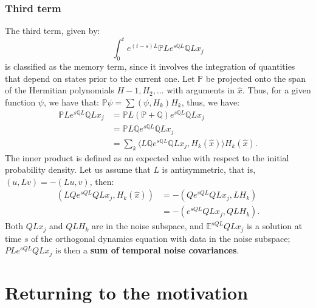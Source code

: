 \documentclass[12pt]{article}
\begin{document}
\subsubsection{Third term}
The third term, given by:
\begin{equation*}
    \int_0^t e^{(t-s)L} \mathbb{P}L e^{s\mathbb{Q}L} \mathbb{Q}L x_j
\end{equation*}
is classified as the memory term, since it involves the integration of quantities that depend on states prior to the current one.
Let $\mathbb{P}$ be projected onto the span of the Hermitian polynomials $H-1, H_2, \ldots$ with arguments in $\hat{x}$. Thus, for a given function $\psi$, we have that: $\mathbb{P}\psi = \sum (\psi, H_k)H_k$, thus, we have:
\begin{align*}
    \mathbb{P}Le^{s\mathbb{Q}L} \mathbb{Q}Lx_j & = \mathbb{P}L(\mathbb{P} + \mathbb{Q})e^{s\mathbb{Q}L} \mathbb{Q}Lx_j                           \\
                                               & = \mathbb{P}L\mathbb{Q}e^{s\mathbb{Q}L} \mathbb{Q}Lx_j                                          \\
                                               & = \sum_k \langle L\mathbb{Q}e^{s\mathbb{Q}L} \mathbb{Q}Lx_j, H_k(\hat{x}) \rangle H_k(\hat{x}). 
\end{align*}
The inner product is defined as an expected value with respect to the initial probability density. Let us assume that $L$ is antisymmetric, that is, $(u, Lv) = -(Lu, v)$, then:
\begin{align*}
    (L Q e^{s Q L} Q L x_j, H_k(\hat{x})) 
      & = - (Q e^{s Q L} Q L x_j, L H_k)  \\
      & = - (e^{s Q L} Q L x_j, Q L H_k).
\end{align*}
Both $Q L x_j$ and $Q L H_k$ are in the noise subspace, and $\mathbb{E}^{s Q L} Q L x_j$ is a solution at time $s$ of the orthogonal dynamics equation with data in the noise subspace; $P L e^{s Q L} Q L x_j$ is then a \textbf{sum of temporal noise covariances}.
\newpage
\section{Returning to the motivation}
\end{document}

